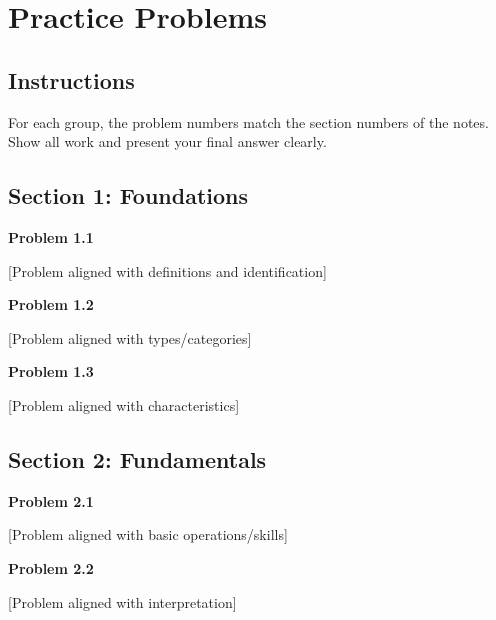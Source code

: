 \documentclass[12pt,letterpaper]{article}
\begin{document}
\newpage

\section{Practice Problems}
\label{sec:practice}

\subsection*{Instructions}

For each group, the problem numbers match the section numbers of the notes.
Show all work and present your final answer clearly.


\subsection{Section 1: Foundations}

\textbf{Problem 1.1}

[Problem aligned with definitions and identification]

\vspace{12pt}

\textbf{Problem 1.2}

[Problem aligned with types/categories]

\vspace{12pt}

\textbf{Problem 1.3}

[Problem aligned with characteristics]

\vspace{12pt}


\subsection{Section 2: Fundamentals}

\textbf{Problem 2.1}

[Problem aligned with basic operations/skills]

\vspace{12pt}

\textbf{Problem 2.2}

[Problem aligned with interpretation]

\vspace{12pt}

\end{document}
